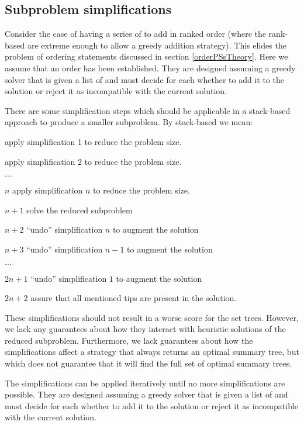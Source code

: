\documentclass[11pt]{article}
\begin{document}
\subsection{Subproblem simplifications}\label{simplificationTheory}
Consider the case of having a series of \pss to add in ranked order (where the
    rank-based are extreme enough to allow a greedy addition strategy).
This elides the problem of ordering statements discussed in section \ref{orderPSsTheory}. 
Here we assume that an order has been established.
They are designed assuming a greedy solver that is given a list of \pss and must decide
    for each whether to add it to the solution or reject it as incompatible with the 
    current solution.

There are some simplification steps which should be applicable in a stack-based
    approach to produce a smaller subproblem.
By stack-based we mean:
\begin{compactenum}
    \item apply simplification 1 to reduce the problem size.
    \item apply simplification 2 to reduce the problem size.
    \item[$\ldots$]
    \item[$n$] apply simplification $n$ to reduce the problem size.
    \item[$n + 1$] solve the reduced subproblem
    \item[$n + 2$]``undo'' simplification $n$ to augment the solution
    \item[$n + 3$] ``undo'' simplification $n-1$ to augment the solution
    \item[$\ldots$]
    \item[$2n + 1$] ``undo'' simplification $1$ to augment the solution
    \item[$2n +2$] assure that all mentioned tips are present in the solution.
\end{compactenum}

These simplifications should not result in a worse \SWIPSD score for the set trees.
However, we lack any guarantees about how they interact with heuristic solutions
    of the reduced subproblem.
Furthermore, we lack guarantees about how the simplifications affect a strategy that always
    returns an optimal summary tree, but which does not guarantee that it will
    find the full set of optimal summary trees.

The simplifications can be applied iteratively until no more simplifications are possible.
They are designed assuming a greedy solver that is given a list of \pss and must decide
    for each whether to add it to the solution or reject it as incompatible with the 
    current solution.
\end{document}
